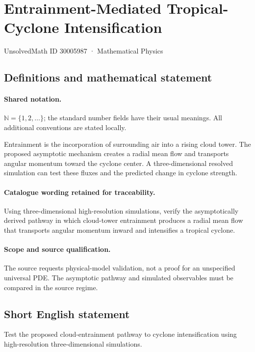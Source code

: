 \documentclass[11pt]{article}
\begin{document}
\setcounter{section}{30005986}
\section{Entrainment-Mediated Tropical-Cyclone Intensification}\label{30005987}
{\small UnsolvedMath ID 30005987 · Mathematical Physics}
\subsection{Definitions and mathematical statement}

\paragraph{Shared notation.}$\mathbb N=\{1,2,\ldots\}$; the standard number fields have their usual meanings. All additional conventions are stated locally.


Entrainment is the incorporation of surrounding air into a rising cloud tower. The proposed asymptotic mechanism creates a radial mean flow and transports angular momentum toward the cyclone center. A three-dimensional resolved simulation can test these fluxes and the predicted change in cyclone strength.

\paragraph{Catalogue wording retained for traceability.}
Using three-dimensional high-resolution simulations, verify the asymptotically derived pathway in which cloud-tower entrainment produces a radial mean flow that transports angular momentum inward and intensifies a tropical cyclone.

\paragraph{Scope and source qualification.}The source requests physical-model validation, not a proof for an unspecified universal PDE. The asymptotic pathway and simulated observables must be compared in the source regime.
\subsection{Short English statement}
Test the proposed cloud-entrainment pathway to cyclone intensification using high-resolution three-dimensional simulations.
\end{document}
